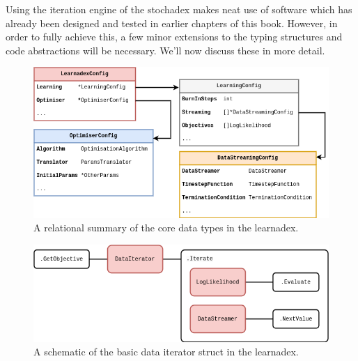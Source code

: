 Using the iteration engine of the stochadex makes neat use of software which has already been designed and tested in earlier chapters of this book. However, in order to fully achieve this, a few minor extensions to the typing structures and code abstractions will be necessary. We'll now discuss these in more detail.

\begin{figure}[h]
\centering
\includegraphics[width=13cm]{images/learnadex-data-types.drawio.png}
\caption{A relational summary of the core data types in the learnadex.}
\label{fig:learnadex-data-types-design}
\end{figure}


\begin{figure}[h]
\centering
\includegraphics[width=13cm]{images/learnadex-data-iterator.drawio.png}
\caption{A schematic of the basic data iterator struct in the learnadex.}
\label{fig:learnadex-data-iterator}
\end{figure}
    